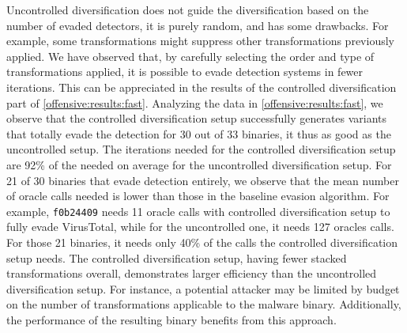   Uncontrolled diversification does not guide the diversification based on the number of evaded detectors, it is purely random, and has some drawbacks.
For example, some transformations might suppress other transformations previously applied.
We have observed that, by carefully selecting the order and type of transformations applied, it is possible to evade detection systems in fewer iterations.
This can be appreciated in the results of the controlled diversification part of \autoref{offensive:results:fast}.
Analyzing the data in \autoref{offensive:results:fast}, we observe that the controlled diversification setup successfully generates variants that totally evade the detection for 30 out of 33 binaries, it thus as good as the uncontrolled setup.
The iterations needed for the controlled diversification setup are 92\% of the needed on average for the uncontrolled diversification setup.
For 21 of 30 binaries that evade detection entirely, we observe that the mean number of oracle calls needed is lower than those in the baseline evasion algorithm.
For example, \texttt{f0b24409} needs 11 oracle calls with controlled diversification setup to fully evade VirusTotal, while for the uncontrolled one, it needs 127 oracles calls.
For those 21 binaries, it needs only 40\% of the calls the controlled diversification setup needs.
The controlled diversification setup, having fewer stacked transformations overall, demonstrates larger efficiency than the uncontrolled diversification setup. 
For instance, a potential attacker may be limited by budget on the number of transformations applicable to the malware binary. 
Additionally, the performance of the resulting binary benefits from this approach.


